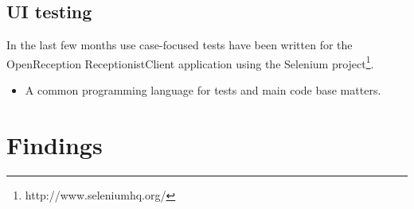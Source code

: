 \subsection{UI testing}
In the last few months use case-focused tests have been written for the OpenReception ReceptionistClient application using the Selenium project\footnote{http://www.seleniumhq.org/}.

\begin{itemize}
  \item A common programming language for tests and main code base matters.
\end{itemize}

\section{Findings}

